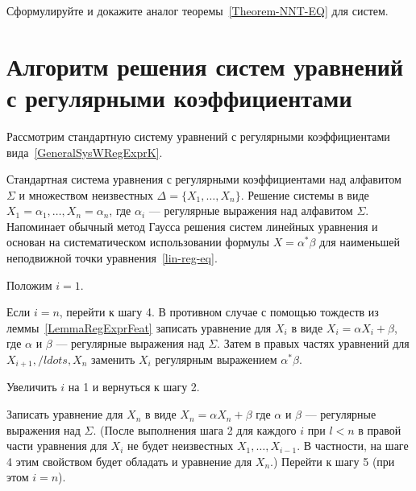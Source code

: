\begin{myproblem}
Сформулируйте и докажите аналог теоремы~\ref{Theorem-NNT-EQ} для систем.
\end{myproblem}

\section[Алгоритм решения систем с регулярными коэффициентами]{Алгоритм решения систем уравнений с регулярными коэффициентами}
\label{Chapter2SysSolverAlg}

Рассмотрим стандартную систему уравнений с регулярными коэффициентами вида~\eqref{GeneralSysWRegExprK}.


%
{\label{Algo-SysEq-Solver} Стандартная система уравнения с регулярными коэффициентами над алфавитом $\Sigma$ и множеством неизвестных $\Delta=\{X_1,\ldots ,X_n\}$.}%
{Решение системы в виде $X_1=\alpha_1,\ldots, X_n=\alpha_n$, где $\alpha_i$ --- регулярные выражения над алфавитом $\Sigma$.}%
{Напоминает обычный метод Гаусса решения систем линейных уравнения и основан на систематическом использовании формулы $X=\alpha^*\beta$ для наименьшей неподвижной точки уравнения~\eqref{lin-reg-eq}.}%
{
    \item Положим $i=1$.
		
    \item Если $i=n$, перейти к шагу 4. В противном случае с помощью тождеств из леммы~\ref{LemmaRegExprFeat} записать уравнение для $X_i$ в виде $X_i=\alpha X_i+\beta$, где $\alpha$ и $\beta$ --- регулярные выражения над $\Sigma$. Затем в правых частях уравнений для $X_{i+1}, /ldots , X_n$ заменить $X_i$ регулярным выражением $\alpha^*\beta$.

    \item Увеличить $i$ на 1 и вернуться к шагу 2.

    \item Записать уравнение для $X_n$ в виде $X_n=\alpha X_n+\beta$ где $\alpha$ и $\beta$ --- регулярные выражения над $\Sigma$. (После выполнения шага 2 для каждого $i$ при $l<n$ в правой части уравнения для $X_i$ не будет неизвестных $X_1, \ldots,X_{i-1}$. В частности, на шаге 4 этим свойством будет обладать и уравнение для $X_n$.) Перейти к шагу 5 (при этом $i=n$).


}

